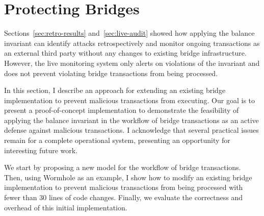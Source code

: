 \section{Protecting Bridges}
\label{sec:active-protect}

Sections~\ref{sec:retro-results} and~\ref{sec:live-audit} showed how
applying the balance invariant can identify attacks retrospectively and
monitor ongoing transactions as an external third party without any
changes to existing bridge infrastructure.  However, the live
monitoring system only alerts on violations of the invariant and does
not prevent violating bridge transactions from being processed.

In this section, I describe an approach for extending an existing
bridge implementation to prevent malicious transactions from
executing.  Our goal is to present a proof-of-concept implementation
to demonstrate the feasibility of applying the balance invariant in the
workflow of bridge transactions as an active defense against malicious
transactions.  I acknowledge that several practical issues remain
for a complete operational system, presenting an opportunity for
interesting future work.




We start by proposing a new model for the workflow of bridge
transactions.  Then, using Wormhole as an example, I show how to
modify an existing bridge implementation to prevent malicious transactions from
being processed with fewer than 30 lines of code changes.  Finally, we
evaluate the correctness and overhead of this initial implementation.

